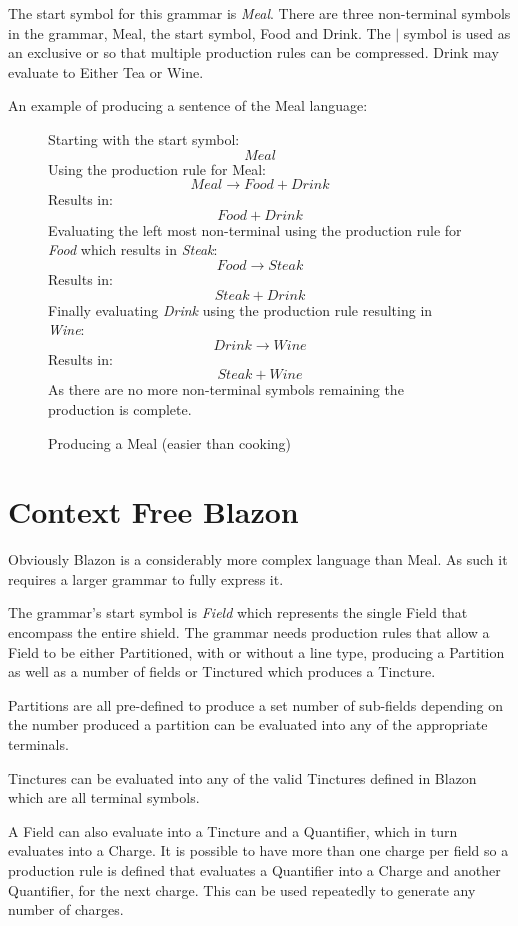 The start symbol for this grammar is \emph{Meal}. There are three non-terminal symbols in the grammar, Meal, the start symbol, Food and Drink.   The $|$ symbol is used as an exclusive or so that multiple production rules can be compressed. Drink may evaluate to Either Tea or Wine. 



An example of producing a sentence of the Meal language:

\begin{figure}[H]

Starting with the start symbol:
\[Meal\] 
Using the production rule for Meal:
\[ Meal \to Food + Drink \]
Results in:
\[Food + Drink\]
Evaluating the left most non-terminal using the production rule for \emph{Food} which results in \emph{Steak}:
\[ Food \to Steak \]
Results in:
\[Steak + Drink\]
Finally evaluating \emph{Drink} using the production rule resulting in \emph{Wine}:
\[ Drink \to  Wine\]
Results in:
\[ Steak + Wine\]
As there are no more non-terminal symbols remaining the production is complete.

\caption{Producing a Meal (easier than cooking)}
\end{figure}


\section{Context Free Blazon}

Obviously Blazon is a considerably more complex language than Meal.  As such it requires a larger grammar to fully express it.  

The grammar's start symbol is \emph{Field} which represents the single Field that encompass the entire shield.  The grammar needs production rules that allow a Field to be either Partitioned, with or without a line type, producing a Partition as well as a number of fields or Tinctured which produces a Tincture. 

Partitions are all pre-defined to produce a set number of sub-fields depending on the number produced a partition can be evaluated into any of the appropriate terminals.

Tinctures can be evaluated into any of the valid Tinctures defined in Blazon which are all terminal symbols. 

A Field can also evaluate into a Tincture and a Quantifier, which in turn evaluates into a Charge.  It is possible to have more than one charge per field so a production rule is defined that evaluates a Quantifier into a Charge and another Quantifier, for the next charge. This can be used repeatedly to generate any number of charges. 


